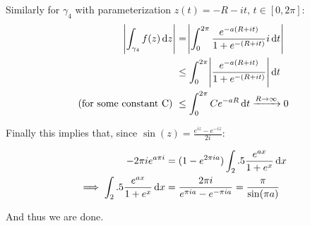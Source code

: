\begin{example}
Similarly for $\gamma_4$ with parameterization $z(t) = -R - it, \, t \in [0,2\pi ]$:
\begin{align*}
    \abs{\int_{\gamma_4} f(z) \dif z } &=\abs{ \int_0^{2\pi} \frac{e^{-a(R+it)}}{1+e^{-(R+it)}} i \dif t }\\
    &\leq \int_0^{2\pi} \abs{\frac{e^{-a(R+it)}}{1+e^{-(R+it)}}}  \dif t\\
    \text{(for some constant C) } &\leq \int_0^{2\pi} Ce^{-aR}  \dif t \xrightarrow[]{R \to \infty} 0 \\
\end{align*}

Finally this implies that, since $\sin(z)  = \frac{e^{iz} - e^{-iz}}{2 i}$:

\begin{align*}
    - 2 \pi i e^{a\pi i} &= (1-e^{2\pi i a}) \int_\R \frac{e^{ax}}{1+e^x} \dif x\\
    \implies \int_\R \frac{e^{ax}}{1+e^x} \dif x &= \frac{2\pi i}{e^{\pi ia} - e^{-\pi i a}} = \frac{\pi}{\sin(\pi a)}
\end{align*}

And thus we are done.

\end{example}